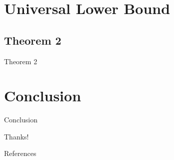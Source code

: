 \documentclass{beamer}
\begin{document}
\section{Universal Lower Bound}
\subsection{Theorem 2}
\begin{frame}{Theorem 2}
\end{frame}

\section{Conclusion}
\begin{frame}{Conclusion}
\end{frame}

\begin{frame}[focus]
    Thanks!
\end{frame}


\appendix

\begin{frame}{References}
    \nocite{*} %
    
    
\end{frame}



\end{document}
